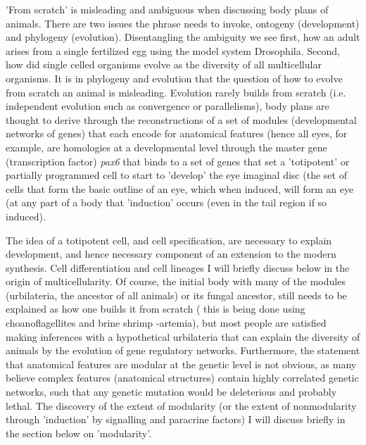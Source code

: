 'From scratch' is misleading and ambiguous when discussing body plans of animals.  There are two issues the phrase needs to invoke, ontogeny (development) and phylogeny (evolution).  Disentangling the ambiguity we see first, how an adult arises from a single fertilized egg using the model system Drosophila.  Second, how did single celled organisms evolve as the diversity of all multicellular organisms.  It is in phylogeny and evolution that the question of how to evolve from scratch an animal is misleading.  Evolution rarely builds from scratch (i.e. independent evolution such as convergence or parallelisms), body plans are thought to derive through the reconstructions of a set of modules (developmental networks of genes) that each encode for anatomical features (hence all eyes, for example, are homologies at a developmental level through the master gene (transcription factor) \textit{pax6} that binds to a set of genes that set a 'totipotent' or partially programmed cell to start to 'develop' the eye imaginal disc (the set of cells that form the basic outline of an eye, which when induced, will form an eye (at any part of a body that 'induction' occurs (even in the tail region if so induced)\cite{devogilbert}.  

The idea of a totipotent cell, and cell specification, are necessary to explain development, and hence necessary component of an extension to the modern synthesis.  Cell differentiation and cell lineages I will briefly discuss below in the origin of multicellularity.  Of course, the initial body with many of the modules (urbilateria, the ancestor of all animals) or its fungal ancestor, still needs to be explained as how one builds it from scratch ( this is being done using choanoflagellites and brine shrimp -artemia), but most people are satisfied making inferences with a hypothetical urbilateria that can explain the diversity of animals by the evolution of gene regulatory networks.  Furthermore, the statement that anatomical features are modular at the genetic level is not obvious, as many believe complex features (anatomical structures) contain highly correlated genetic networks, such that any genetic mutation would be deleterious and probably lethal.  The discovery of the extent of modularity (or the extent of nonmodularity through 'induction' by signalling and paracrine factors) I will discuss briefly in the section below on 'modularity'.        


